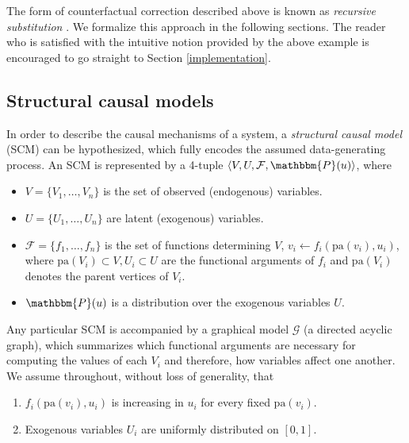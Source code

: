 \documentclass[
  nojss]{jss}
\providecommand{\tightlist}{%
  \setlength{\itemsep}{0pt}\setlength{\parskip}{0pt}}
\begin{document}
The form of counterfactual correction described above is known as
\emph{recursive substitution} \citep[Chapter~7]{pearl2009causality}. We
formalize this approach in the following sections. The reader who is
satisfied with the intuitive notion provided by the above example is
encouraged to go straight to Section \ref{implementation}.

\hypertarget{structural-causal-models}{%
\subsection{Structural causal models}\label{structural-causal-models}}

In order to describe the causal mechanisms of a system, a
\emph{structural causal model} (SCM) can be hypothesized, which fully
encodes the assumed data-generating process. An SCM is represented by a
4-tuple \(\langle V, U, \mathcal{F}, \mathbbm{P}(u) \rangle\), where

\begin{itemize}
\tightlist
\item
  \(V = \lbrace V_1, \ldots, V_n \rbrace\) is the set of observed
  (endogenous) variables.
\item
  \(U = \lbrace U_1, \ldots, U_n \rbrace\) are latent (exogenous)
  variables.
\item
  \(\mathcal{F} = \lbrace f_1, \ldots, f_n \rbrace\) is the set of
  functions determining \(V\), \(v_i \gets f_i(\mathrm{pa}(v_i), u_i)\),
  where \(\mathrm{pa}(V_i) \subset V, U_i \subset U\) are the functional
  arguments of \(f_i\) and \(\mathrm{pa}(V_i)\) denotes the parent
  vertices of \(V_i\).
\item
  \(\mathbbm{P}(u)\) is a distribution over the exogenous variables
  \(U\).
\end{itemize}

Any particular SCM is accompanied by a graphical model \(\mathcal{G}\)
(a directed acyclic graph), which summarizes which functional arguments
are necessary for computing the values of each \(V_i\) and therefore,
how variables affect one another. We assume throughout, without loss of
generality, that

\begin{enumerate}
\def\labelenumi{(\roman{enumi})}
\tightlist
\item
  \(f_i(\mathrm{pa}(v_i), u_i)\) is increasing in \(u_i\) for every
  fixed \(\mathrm{pa}(v_i)\).
\item
  Exogenous variables \(U_i\) are uniformly distributed on \([0, 1]\).
\end{enumerate}
\end{document}
